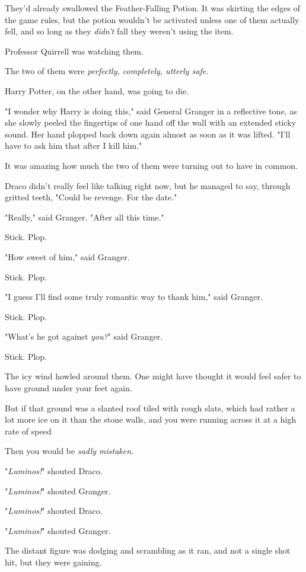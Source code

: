 They'd already swallowed the Feather-Falling Potion. It was skirting the edges
of the game rules, but the potion wouldn't be activated unless one of them
actually fell, and so long as they \emph{didn't} fall they weren't using the
item.

Professor Quirrell was watching them.

The two of them were \emph{perfectly, completely, utterly safe.}

Harry Potter, on the other hand, was going to die.

"I wonder why Harry is doing this," said General Granger in a reflective tone,
as she slowly peeled the fingertips of one hand off the wall with an extended
sticky sound. Her hand plopped back down again almost as soon as it was lifted.
"I'll have to ask him that after I kill him."

It was amazing how much the two of them were turning out to have in common.

Draco didn't really feel like talking right now, but he managed to say, through
gritted teeth, "Could be revenge. For the date."

"Really," said Granger. "After all this time."

Stick. Plop.

"How sweet of him," said Granger.

Stick. Plop.

"I guess I'll find some truly romantic way to thank him," said Granger.

Stick. Plop.

"What's he got against \emph{you?}" said Granger.

Stick. Plop.

The icy wind howled around them.
\sbreak
One might have thought it would feel safer to have ground under your feet again.

But if that ground was a slanted roof tiled with rough slats, which had rather
a lot more ice on it than the stone walls, and you were running across it at a
high rate of speed{\el}

Then you would be \emph{sadly mistaken.}

"\emph{Luminos!}" shouted Draco.

"\emph{Luminos!}" shouted Granger.

"\emph{Luminos!}" shouted Draco.

"\emph{Luminos!}" shouted Granger.

The distant figure was dodging and scrambling as it ran, and not a single shot
hit, but they were gaining.

